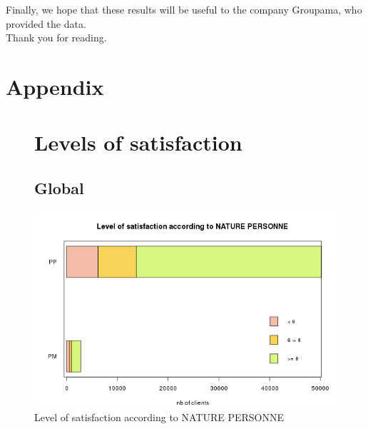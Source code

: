 \documentclass[a4paper, 11pt]{article}
\begin{document}
    Finally, we hope that these results will be useful to the company Groupama, who provided the data. \\

    Thank you for reading.

\clearpage
\appendix

\section*{Appendix}
\label{appendix}

{
    \footnotesize
    \listoffigures
    \listoftables
}
\clearpage    

    \begin{figure}[!ht]
    \section{Levels of satisfaction}
    \label{app:satisfaction}
    	\subsection{Global}
    	\centering
            \includegraphics[width = 10 cm]{Remi/Level_of_satisfaction_according_to_NATURE_PERSONNE.png}
            \caption{Level of satisfaction according to NATURE PERSONNE}
            \label{fig:NATURE_PERSONNE}
    \end{figure}
    
\end{document}
